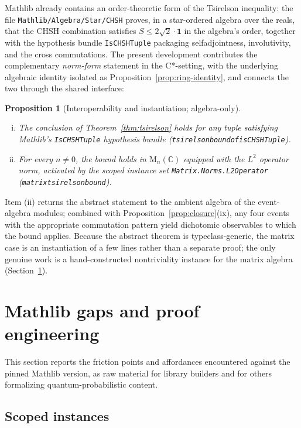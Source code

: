 \documentclass[11pt]{article}
\renewcommand{\_}{\textunderscore\allowbreak}
\newtheorem{proposition}{Proposition}
\theoremstyle{remark}
\newcommand{\C}{\mathbb C}
\newcommand{\Mn}{\mathrm{M}_n(\C)}
\newcommand{\one}{\mathbf 1}
\begin{document}
Mathlib already contains an order-theoretic form of the Tsirelson inequality: the file \texttt{Mathlib/Algebra/Star/CHSH} proves, in a star-ordered algebra over the reals, that the CHSH combination satisfies $S \le 2\sqrt{2} \cdot \one$ in the algebra's order, together with the hypothesis bundle \texttt{IsCHSHTuple} packaging selfadjointness, involutivity, and the cross commutations. The present development contributes the complementary \emph{norm-form} statement in the C*-setting, with the underlying algebraic identity isolated as Proposition~\ref{prop:ring-identity}, and connects the two through the shared interface:

\begin{proposition}[Interoperability and instantiation; algebra-only]
\label{prop:tsirelson-instances}
\begin{enumerate}[(i)]
\item The conclusion of Theorem~\ref{thm:tsirelson} holds for any tuple satisfying Mathlib's \texttt{IsCHSHTuple} hypothesis bundle (\texttt{tsirelson\_bound\_of\_isCHSHTuple}).
\item For every $n \neq 0$, the bound holds in $\Mn$ equipped with the $L^2$ operator norm, activated by the scoped instance set \texttt{Matrix.Norms.L2Operator} (\texttt{matrix\_tsirelson\_bound}).
\end{enumerate}
\end{proposition}

Item (ii) returns the abstract statement to the ambient algebra of the event-algebra modules; combined with Proposition~\ref{prop:closure}(ix), any four events with the appropriate commutation pattern yield dichotomic observables to which the bound applies. Because the abstract theorem is typeclass-generic, the matrix case is an instantiation of a few lines rather than a separate proof; the only genuine work is a hand-constructed nontriviality instance for the matrix algebra (Section~\ref{sec:gaps}).

\section{Mathlib gaps and proof engineering}
\label{sec:gaps}

This section reports the friction points and affordances encountered against the pinned Mathlib version, as raw material for library builders and for others formalizing quantum-probabilistic content.

\subsection{Scoped instances}
\end{document}
